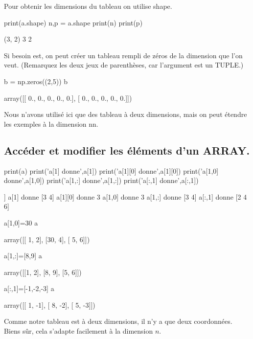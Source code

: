 \documentclass[french,11pt,twoside]{VcCours}
\begin{document}
Pour obtenir les dimensions du tableau on utilise shape.
\begin{PY}
print(a.shape)
n,p = a.shape
print(n)
print(p)
\end{PY}
\begin{PYout}
(3, 2)
3
2
\end{PYout}
Si besoin est, on peut créer un tableau rempli de zéros de la dimension que l'on veut. (Remarquez les deux jeux de parenthèses, car l'argument est un TUPLE.)
\begin{PY}
b = np.zeros((2,5))
b
\end{PY}
\begin{PYout}
array([[ 0.,  0.,  0.,  0.,  0.],
       [ 0.,  0.,  0.,  0.,  0.]])
\end{PYout}
Nous n'avons utilisé ici que des tableau à deux dimensions, mais on peut étendre les exemples à la dimension nn.

\subsection{Accéder et modifier les éléments d'un ARRAY.}
\begin{PY}
print(a)
print('a[1]    donne',a[1])
print('a[1][0] donne',a[1][0])
print('a[1,0]  donne',a[1,0])
print('a[1,:]  donne',a[1,:])
print('a[:,1]  donne',a[:,1])
\end{PY}
\begin{PYout}
[[1 2]
 [3 4]
 [5 6]]
a[1]    donne [3 4]
a[1][0] donne 3
a[1,0]  donne 3
a[1,:]  donne [3 4]
a[:,1]  donne [2 4 6]
\end{PYout}
\begin{PY}
a[1,0]=30
a
\end{PY}
\begin{PYout}
array([[ 1,  2],
       [30,  4],
       [ 5,  6]])
\end{PYout}
\begin{PY}
a[1,:]=[8,9]
a
\end{PY}
\begin{PYout}
array([[1, 2],
       [8, 9],
       [5, 6]])
\end{PYout}
\begin{PY}
a[:,1]=[-1,-2,-3]
a
\end{PY}
\begin{PYout}
array([[ 1, -1],
       [ 8, -2],
       [ 5, -3]])
\end{PYout}
Comme notre tableau est à deux dimensions, il n'y a que deux coordonnées. Biens sûr, cela s'adapte facilement à la dimension $n$.
\end{document}
